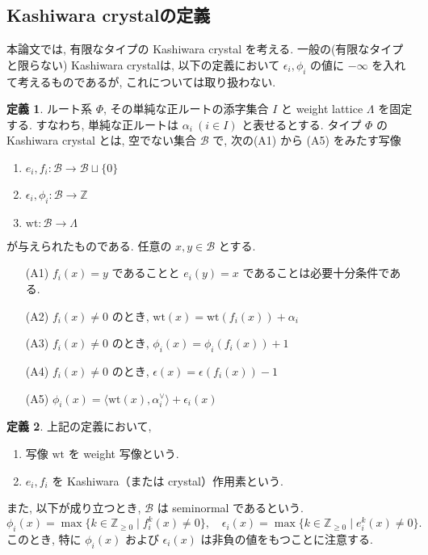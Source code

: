 \documentclass[
  a4paper, 
  12pt,
  ja=standard,
  xelatex,
  left=30truemm,
  right=30truemm,
  titlepage 
]{bxjsarticle}
\theoremstyle{definition}
\newtheorem{df}{定義}[section]
\begin{document}
\subsection{Kashiwara crystalの定義}
本論文では, 有限なタイプの Kashiwara crystal を考える.
一般の(有限なタイプと限らない) Kashiwara crystalは, 以下の定義において $\epsilon_i, \phi_i $
の値に $ - \infty $ を入れて考えるものであるが, これについては取り扱わない.

\begin{df}
  ルート系 $\Phi$, その単純な正ルートの添字集合 $I$ と weight lattice $\Lambda$ を固定する.
  すなわち, 単純な正ルートは $\alpha_i \ ( i \in I )$ と表せるとする.
  タイプ $\Phi$ の Kashiwara crystal とは, 空でない集合 $\mathcal{B}$ で, 次の(A1) から (A5)
  をみたす写像
  \begin{enumerate}
    \item $e_i, f_i : \mathcal{B} \to \mathcal{B} \sqcup \{ 0 \}$
    \item $\epsilon_i, \phi_i : \mathcal{B} \to \mathbb{Z}$
    \item $\mathrm{wt} : \mathcal{B} \to \Lambda$
  \end{enumerate}
  が与えられたものである. 任意の $x, y \in \mathcal{B}$ とする.
  \begin{enumerate} 
    \item [(A1)] $f_i(x) = y$ であることと $e_i(y) = x$ であることは必要十分条件である.
    \item [(A2)] $f_i(x) \neq 0$ のとき, $\mathrm{wt}(x) = \mathrm{wt}(f_i(x)) + \alpha_i$
    \item [(A3)] $f_i(x) \neq 0$ のとき, $\phi_i(x) = \phi_i(f_i(x)) + 1$
    \item [(A4)] $f_i(x) \neq 0$ のとき, $\epsilon(x) = \epsilon(f_i(x)) - 1$
    \item [(A5)] $\phi_i(x) = \langle \mathrm{wt}(x), \alpha_i ^{ \vee } \rangle + \epsilon_i(x)$
  \end{enumerate}
\end{df}

\begin{df}
  上記の定義において,
  \begin{enumerate}
    \item 写像 $\mathrm{wt}$ を weight 写像という.
    \item $e_i, f_i$ を Kashiwara（または crystal）作用素という.
  \end{enumerate}
  また, 以下が成り立つとき, $\mathcal{B}$ は seminormal であるという.
  \[
    \phi_i(x) = \max\{ k \in \mathbb{Z}_{\geq 0} \mid f_i^k(x) \neq 0 \}, 
    \quad \epsilon_i(x) = \max\{ k \in \mathbb{Z}_{\geq 0} \mid e_i^k(x) \neq 0 \}.
  \]
  このとき, 特に $\phi_i(x)$ および $\epsilon_i(x)$ は非負の値をもつことに注意する.
\end{df}
\end{document}

